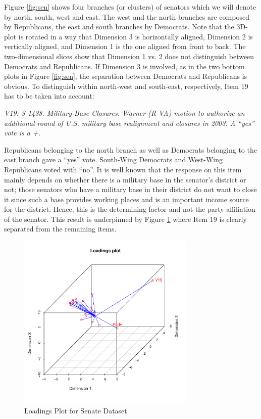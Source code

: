 \documentclass[article]{jss1}
\begin{document}
Figure \ref{fig:sen} shows four branches (or clusters) of senators which we will denote by north, south, west and east. The west and the north branches are composed by Republicans, the east and south branches by Democrats. Note that the 3D-plot is rotated in a way that Dimension 3 is horizontally aligned, Dimension 2 is vertically aligned, and Dimension 1 is the one aligned from front to back. The two-dimensional slices show that Dimension 1 vs. 2 does not distinguish between Democrats and Republicans. If Dimension 3 is involved, as in the two bottom plots in Figure \ref{fig:sen}, the separation between Democrats and Republicans is obvious. To distinguish within north-west and south-east, respectively, Item 19 has to be taken into account:

\emph{V19: S 1438. Military Base Closures. Warner (R-VA) motion to authorize an additional round of U.S. military base realignment and closures in 2003. A ``yes'' vote is a +.} 

Republicans belonging to the north branch as well as Democrats belonging to the east branch gave a ``yes'' vote. South-Wing Democrats and West-Wing Republicans voted with ``no''. It is well known that the response on this item mainly depends on whether there is a military base in the senator's district or not; those senators who have a military base in their district do not want to close it since such a base provides working places and is an important income source for the district. Hence, this is the determining factor and not the party affiliation of the senator. This result is underpinned by Figure \ref{fig:senload} where Item 19 is clearly separated from the remaining items.

\begin{figure}[ht]
\begin{center}
\includegraphics[height=85mm, width=85mm]{senateload.pdf}
\caption{\label{fig:senload} Loadings Plot for Senate Dataset}
\end{center}
\end{figure}
\end{document}
